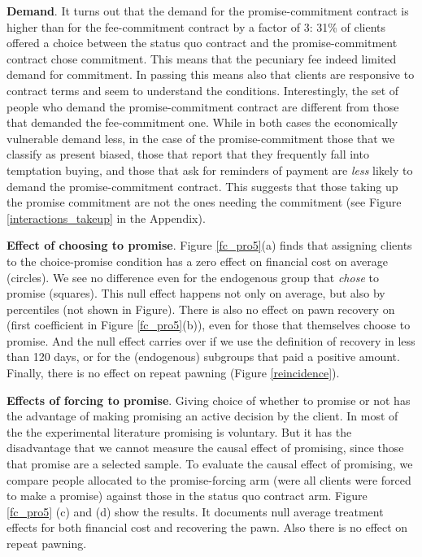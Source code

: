 \documentclass[oneside,11pt]{article}
\begin{document}
\vspace{.1in}
\noindent \textbf{Demand}. It turns out that the demand for the promise-commitment contract  is higher than for the fee-commitment contract by a factor of 3: 31\% of clients offered a choice between the status quo contract and the promise-commitment contract chose commitment. This means that the pecuniary fee indeed limited demand for commitment. In passing this means also that clients are responsive to contract terms and seem to understand the conditions. Interestingly, the set of people who demand the promise-commitment contract are different from those that demanded the fee-commitment one. While in both cases the economically vulnerable demand less, in the case of the promise-commitment those that we classify as present biased, those that report that they frequently fall into temptation buying, and those that ask for reminders of payment are \textit{less} likely to demand the promise-commitment contract.  This suggests that those taking up the promise commitment are not the ones needing the commitment (see Figure \ref{interactions_takeup} in the Appendix). 

\vspace{.2in}
\noindent \textbf{Effect of choosing to promise}. Figure \ref{fc_pro5}(a) finds that assigning clients to the choice-promise condition has a zero effect on financial cost on average (circles). We see no difference even for the endogenous group that \textit{chose} to promise (squares). This null effect happens not only on average, but also by percentiles (not shown in Figure). There is also no effect on pawn recovery on (first coefficient in Figure \ref{fc_pro5}(b)), even for those that themselves choose to promise. And the null effect carries over if we use the definition of recovery in less than 120 days, or for the (endogenous) subgroups that paid a positive amount. Finally, there is no effect on repeat pawning (Figure \ref{reincidence}). 

\vspace{.2in}
\noindent \textbf{Effects of forcing to promise}. Giving choice of whether to promise or not has the advantage of making promising an active decision by the client. In most of the the experimental literature promising is voluntary. But it has the disadvantage that we cannot measure the causal effect of promising, since those that promise are a selected sample. To evaluate the causal effect of promising, we compare people allocated to the promise-forcing arm (were all clients were forced to make a promise) against those in the status quo contract arm. Figure \ref{fc_pro5} (c) and (d) show the results. It documents null average treatment effects for both financial cost and recovering the pawn. Also there is no effect on repeat pawning.
\end{document}
